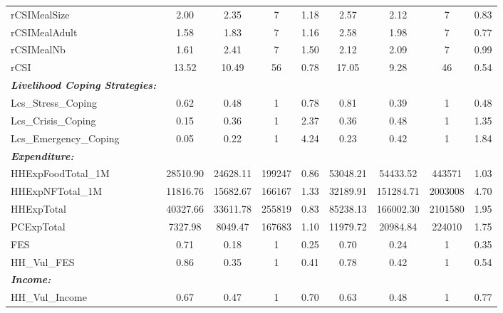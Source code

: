 {\begin{tabular}{l*{2}{cccc}}
rCSIMealSize&        2.00&        2.35&           7&        1.18&        2.57&        2.12&           7&        0.83\\
rCSIMealAdult&        1.58&        1.83&           7&        1.16&        2.58&        1.98&           7&        0.77\\
rCSIMealNb  &        1.61&        2.41&           7&        1.50&        2.12&        2.09&           7&        0.99\\
rCSI        &       13.52&       10.49&          56&        0.78&       17.05&        9.28&          46&        0.54\\
  \textbf{\textit{Livelihood Coping Strategies:}}&            &            &            &            &            &            &            &            \\
Lcs\_Stress\_Coping&        0.62&        0.48&           1&        0.78&        0.81&        0.39&           1&        0.48\\
Lcs\_Crisis\_Coping&        0.15&        0.36&           1&        2.37&        0.36&        0.48&           1&        1.35\\
Lcs\_Emergency\_Coping&        0.05&        0.22&           1&        4.24&        0.23&        0.42&           1&        1.84\\
  \textbf{\textit{Expenditure:}}&            &            &            &            &            &            &            &            \\
HHExpFoodTotal\_1M&    28510.90&    24628.11&      199247&        0.86&    53048.21&    54433.52&      443571&        1.03\\
HHExpNFTotal\_1M&    11816.76&    15682.67&      166167&        1.33&    32189.91&   151284.71&     2003008&        4.70\\
HHExpTotal  &    40327.66&    33611.78&      255819&        0.83&    85238.13&   166002.30&     2101580&        1.95\\
PCExpTotal  &     7327.98&     8049.47&      167683&        1.10&    11979.72&    20984.84&      224010&        1.75\\
FES         &        0.71&        0.18&           1&        0.25&        0.70&        0.24&           1&        0.35\\
HH\_Vul\_FES  &        0.86&        0.35&           1&        0.41&        0.78&        0.42&           1&        0.54\\
      \textbf{\textit{Income:}}&            &            &            &            &            &            &            &            \\
HH\_Vul\_Income&        0.67&        0.47&           1&        0.70&        0.63&        0.48&           1&        0.77\\
\hline\hline
\end{tabular}
}
